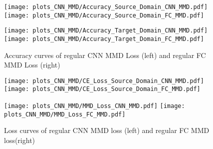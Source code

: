 \begin{figure}[p]
  \centering
  \texttt{[image: plots\_CNN\_MMD/Accuracy\_Source\_Domain\_CNN\_MMD.pdf]}
  \hspace{.3cm}
  \texttt{[image: plots\_CNN\_MMD/Accuracy\_Source\_Domain\_FC\_MMD.pdf]}

  \vspace{.1cm}

  \texttt{[image: plots\_CNN\_MMD/Accuracy\_Target\_Domain\_CNN\_MMD.pdf]}
  \hspace{.1cm}
  \texttt{[image: plots\_CNN\_MMD/Accuracy\_Target\_Domain\_FC\_MMD.pdf]}

  \caption{Accuracy curves of regular CNN MMD Loss (left) and regular FC MMD Loss (right)}
  \label{fig:accuracy_cnn_and_no_cnn_mmd}
\end{figure}
\FloatBarrier 




\begin{figure}[p]
  \centering
  \texttt{[image: plots\_CNN\_MMD/CE\_Loss\_Source\_Domain\_CNN\_MMD.pdf]}
  \hspace{.3cm}
  \texttt{[image: plots\_CNN\_MMD/CE\_Loss\_Source\_Domain\_FC\_MMD.pdf]}

  \vspace{.1cm}

  \texttt{[image: plots\_CNN\_MMD/MMD\_Loss\_CNN\_MMD.pdf]}
  \hspace{.1cm}
  \texttt{[image: plots\_CNN\_MMD/MMD\_Loss\_FC\_MMD.pdf]}

  \caption{Loss curves of regular CNN MMD loss (left) and regular FC MMD loss(right)}
  \label{fig:loss_cnn_and_no_cnn_mmd}
\end{figure}
\FloatBarrier 



